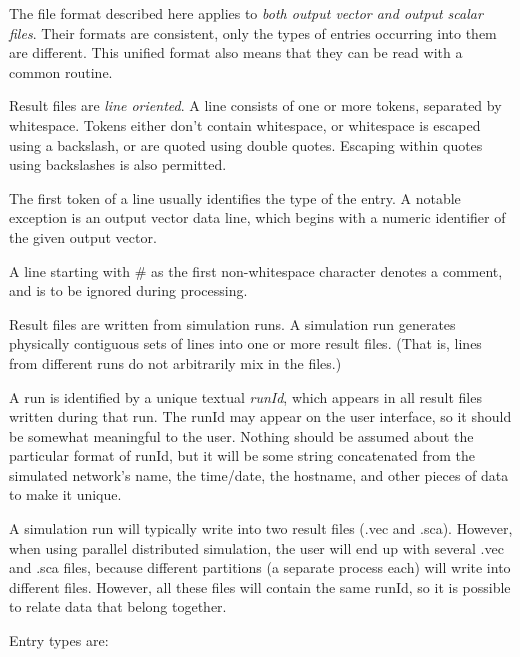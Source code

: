 \label{cha:result-file-formats}

The file format described here applies to \textit{both output vector and
output scalar files}. Their formats are consistent, only the types of
entries occurring into them are different. This unified format also
means that they can be read with a common routine.

Result files are \textit{line oriented}. A line consists of one or more
tokens, separated by whitespace. Tokens either don't
contain whitespace, or whitespace is escaped using a backslash, or
are quoted using double quotes. Escaping within quotes using
backslashes is also permitted.

The first token of a line usually identifies the type of the entry. A
notable exception is an output vector data line, which begins with a
numeric identifier of the given output vector.

A line starting with \# as the first non{}-whitespace character denotes
a comment, and is to be ignored during processing.

Result files are written from simulation runs. A simulation run
generates physically contiguous sets of lines into one or more result
files. (That is, lines from different runs do not arbitrarily mix in
the files.)

A run is identified by a unique textual \textit{runId}, which appears in
all result files written during that run. The runId may appear on the
user interface, so it should be somewhat meaningful to the user.
Nothing should be assumed about the particular format of runId, but it
will be some string concatenated from the simulated network's name, the
time/date, the hostname, and other pieces of data to make it unique.

A simulation run will typically write into two result files (.vec and
.sca). However, when using parallel distributed simulation, the user
will end up with several .vec and .sca files, because different
partitions (a separate process each) will write into different files.
However, all these files will contain the same runId, so it is possible
to relate data that belong together.

Entry types are:

